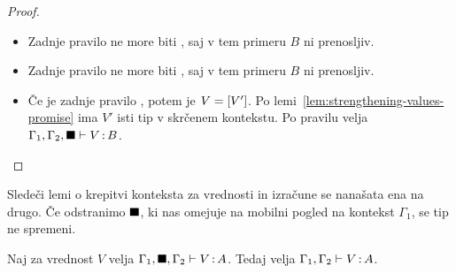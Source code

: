 \begin{proof}
\begin{itemize}
		\item Zadnje pravilo ne more biti , saj v tem primeru $B$ ni prenosljiv.
		
		\item Zadnje pravilo ne more biti , saj v tem primeru $B$ ni prenosljiv.
		
		\item Če je zadnje pravilo , potem je $V = [V']$.
		Po lemi~\ref{lem:strengthening-values-promise} ima $V'$ isti tip v skrčenem kontekstu.
		Po pravilu  velja $\Gamma_1, \Gamma_2, \blacksquare \vdash V \mathinner{:} B$.
		
	\end{itemize}
\end{proof}

Sledeči lemi o krepitvi konteksta za vrednosti in izračune se nanašata ena na drugo. Če odstranimo $\blacksquare$, ki nas omejuje na mobilni pogled na kontekst $\Gamma_1$, se tip ne spremeni.

\begin{lema}\label{lem:strengthening-values-bb}
	Naj za vrednost $V$ velja $\Gamma_1, \blacksquare, \Gamma_2 \vdash V \mathinner{:} A$. Tedaj velja $\Gamma_1, \Gamma_2 \vdash V \mathinner{:} A$.
\end{lema}


